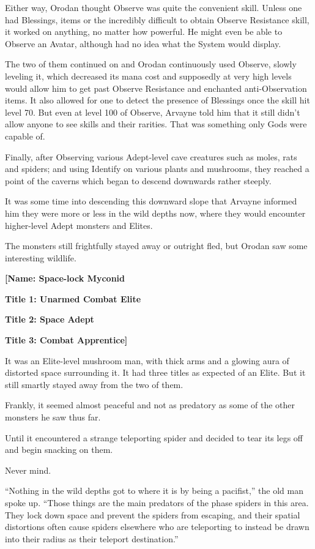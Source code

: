 \documentclass[a4paper,10pt]{book}
\begin{document}
Either way, Orodan thought Observe was quite the convenient skill. Unless one had Blessings, items or the incredibly difficult to obtain Observe Resistance skill, it worked on anything, no matter how powerful. He might even be able to Observe an Avatar, although had no idea what the System would display.\par
The two of them continued on and Orodan continuously used Observe, slowly leveling it, which decreased its mana cost and supposedly at very high levels would allow him to get past Observe Resistance and enchanted anti-Observation items. It also allowed for one to detect the presence of Blessings once the skill hit level 70. But even at level 100 of Observe, Arvayne told him that it still didn’t allow anyone to see skills and their rarities. That was something only Gods were capable of.\par
Finally, after Observing various Adept-level cave creatures such as moles, rats and spiders; and using Identify on various plants and mushrooms, they reached a point of the caverns which began to descend downwards rather steeply.\par
It was some time into descending this downward slope that Arvayne informed him they were more or less in the wild depths now, where they would encounter higher-level Adept monsters and Elites.\par
The monsters still frightfully stayed away or outright fled, but Orodan saw some interesting wildlife.\par
\textbf{[Name: Space-lock Myconid}\par
\textbf{Title 1: Unarmed Combat Elite}\par
\textbf{Title 2: Space Adept}\par
\textbf{Title 3: Combat Apprentice]}\par
It was an Elite-level mushroom man, with thick arms and a glowing aura of distorted space surrounding it. It had three titles as expected of an Elite. But it still smartly stayed away from the two of them.\par
Frankly, it seemed almost peaceful and not as predatory as some of the other monsters he saw thus far.\par
Until it encountered a strange teleporting spider and decided to tear its legs off and begin snacking on them.\par
Never mind.\par
“Nothing in the wild depths got to where it is by being a pacifist,” the old man spoke up. “Those things are the main predators of the phase spiders in this area. They lock down space and prevent the spiders from escaping, and their spatial distortions often cause spiders elsewhere who are teleporting to instead be drawn into their radius as their teleport destination.”\par
\end{document}
